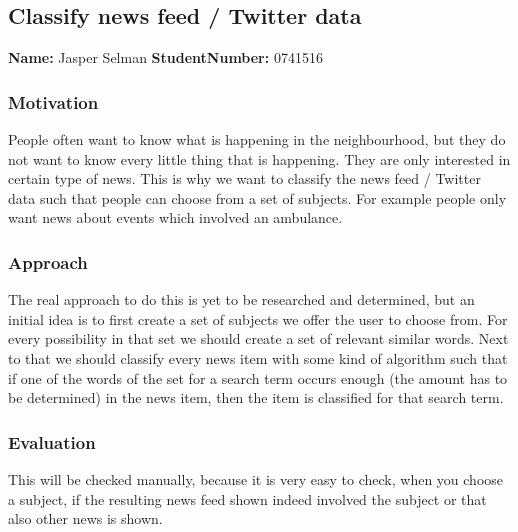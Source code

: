 \subsection{Classify news feed / Twitter data}
\textbf{Name:} Jasper Selman \indent \textbf{StudentNumber:} 0741516

\subsubsection*{Motivation}
People often want to know what is happening in the neighbourhood, but they do not want to know every little thing that is happening.
They are only interested in certain type of news. This is why we want to classify the news feed / Twitter data such that people can choose from a set of subjects. For example people only want news about events which involved an ambulance. 

\subsubsection*{Approach}
The real approach to do this is yet to be researched and determined, but an initial idea is to first create a set of subjects we offer the user to choose from. For every possibility in that set we should create a set of relevant similar words. Next to that we should classify every news item with some kind of algorithm such that if one of the words of the set for a search term occurs enough (the amount has to be determined) in the news item, then the item is classified for that search term.

\subsubsection*{Evaluation }
This will be checked manually, because it is very easy to check, when you choose a subject, if the resulting news feed shown indeed involved the subject or that also other news is shown.
